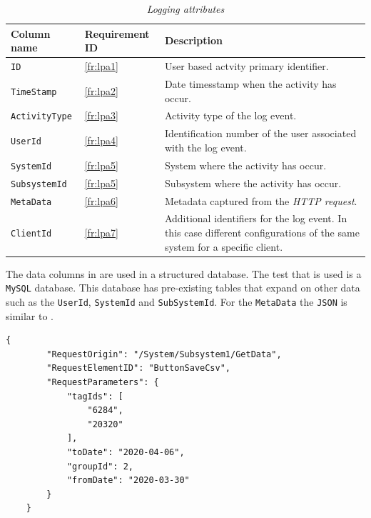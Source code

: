 \begin{table}[!htb]
	\centering
	\caption[Logging attributes]
	{\textit{Logging attributes}}
	\label{tbl:ch3_Log_Attributes}
	\begin{tabularx}{\textwidth}{|l|l|X|}
		\hline \textbf{Column name} & \textbf{Requirement ID} & \textbf{Description}\\
		\hline \texttt{ID} & \ref{fr:lpa1} & User based actvity primary identifier. \\
		\hline \texttt{TimeStamp} & \ref{fr:lpa2} & Date timesstamp when the activity has occur. \\
		\hline \texttt{ActivityType} & \ref{fr:lpa3} & Activity type of the log event. \\
		\hline \texttt{UserId} & \ref{fr:lpa4} & Identification number of the user associated with the log event. \\
		\hline \texttt{SystemId} & \ref{fr:lpa5} & System where the activity has occur. \\
		\hline \texttt{SubsystemId} & \ref{fr:lpa5} & Subsystem where the activity has occur. \\
		\hline \texttt{MetaData} & \ref{fr:lpa6} & Metadata captured from the \textit{HTTP request}. \\
		\hline \texttt{ClientId} & \ref{fr:lpa7} & Additional identifiers for the log event. In this case different configurations of the same system for a specific client. \\
		\hline
	\end{tabularx}
\end{table}

The data columns in  are used in a structured database. The test that is used is a \texttt{MySQL} database. This database has pre-existing tables that expand on other data such as the \texttt{UserId}, \texttt{SystemId} and \texttt{SubSystemId}. For the \texttt{MetaData} the \texttt{JSON} is similar to .

\medskip

\begin{lstlisting}[style=json, caption={\textit{Metadata JSON}}, label={fig:ch3_MetadataJson}] 
	{
		"RequestOrigin": "/System/Subsystem1/GetData",
		"RequestElementID": "ButtonSaveCsv",
		"RequestParameters": {
			"tagIds": [
				"6284",
				"20320"
			],
			"toDate": "2020-04-06",
			"groupId": 2,
			"fromDate": "2020-03-30"
		}
	}
\end{lstlisting}

\clearpage

